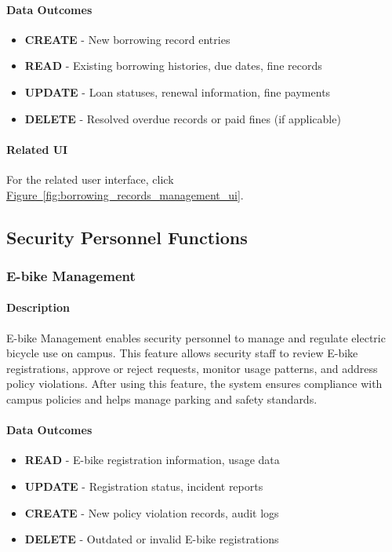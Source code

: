 \documentclass[12pt]{article}
\begin{document}
\paragraph{Data Outcomes}
\begin{itemize}
    \item \textbf{CREATE} - New borrowing record entries
    \item \textbf{READ} - Existing borrowing histories, due dates, fine records
    \item \textbf{UPDATE} - Loan statuses, renewal information, fine payments
    \item \textbf{DELETE} - Resolved overdue records or paid fines (if applicable)
\end{itemize}

\paragraph{Related UI}
For the related user interface, click \hyperref[fig:borrowing_records_management_ui]{Figure~\ref*{fig:borrowing_records_management_ui}}.

\subsection{Security Personnel Functions}
\subsubsection{E-bike Management}

\paragraph{Description}
E-bike Management enables security personnel to manage and regulate electric bicycle use on campus. This feature allows security staff to review E-bike registrations, approve or reject requests, monitor usage patterns, and address policy violations. After using this feature, the system ensures compliance with campus policies and helps manage parking and safety standards.

\paragraph{Data Outcomes}
\begin{itemize}
    \item \textbf{READ} - E-bike registration information, usage data
    \item \textbf{UPDATE} - Registration status, incident reports
    \item \textbf{CREATE} - New policy violation records, audit logs
    \item \textbf{DELETE} - Outdated or invalid E-bike registrations
\end{itemize}
\end{document}

